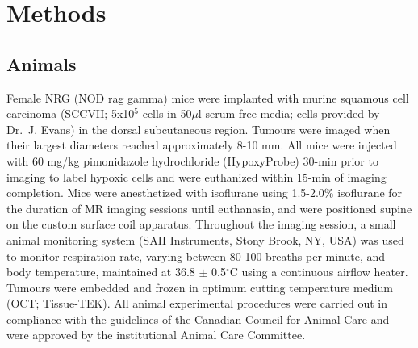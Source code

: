 \section{Methods}
\subsection{Animals}
Female NRG (NOD rag gamma) mice were implanted with murine squamous cell carcinoma (SCCVII; 5x10$^5$ cells in 50$\mu$l serum-free media; cells provided by Dr.\ J. Evans) in the dorsal subcutaneous region.
Tumours were imaged when their largest diameters reached approximately 8-10 mm.
All mice were injected with 60 mg/kg pimonidazole hydrochloride (HypoxyProbe) 30-min prior to imaging to label hypoxic cells and were euthanized within 15-min of imaging completion.
Mice were anesthetized with isoflurane using 1.5-2.0\% isoflurane for the duration of MR imaging sessions until euthanasia, and were positioned supine on the custom surface coil apparatus.
Throughout the imaging session, a small animal monitoring system (SAII Instruments, Stony Brook, NY, USA) was used to monitor respiration rate, varying between 80-100 breaths per minute, and body temperature, maintained at 36.8 $\pm$ 0.5$^\circ$C using a continuous airflow heater. 
Tumours were embedded and frozen in optimum cutting temperature medium (OCT; Tissue-TEK).
All animal experimental procedures were carried out in compliance with the guidelines of the Canadian Council for Animal Care and were approved by the institutional Animal Care Committee.

